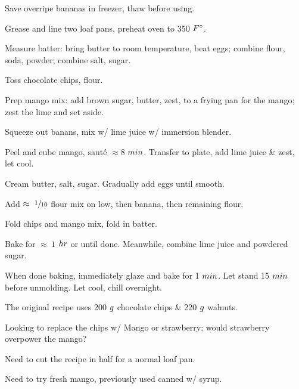 \begin{preparation}
\item Save overripe bananas in freezer, thaw before using.

\item Grease and line two loaf pans, preheat oven to 350 $\Fahrenheit$.

\item Measure batter: bring butter to room temperature, beat eggs; combine
    flour, soda, powder; combine salt, sugar.

\item Toss chocolate chips, flour.

\item Prep mango mix: add brown sugar, butter, zest, to a frying pan for the mango;
    zest the lime and set aside.

\item Squeeze out banans, mix w/ lime juice w/ immersion blender.

\item Peel and cube mango, saut\'{e} $\approx 8$ $\minute$.
    Transfer to plate, add lime juice \& zest, let cool.

\item Cream butter, salt, sugar.
    Gradually add eggs until smooth.

\item Add $\approx~\onetenth$ flour mix on low, then banana, then remaining flour.

\item Fold chips and mango mix, fold in batter.

\item Bake for $\approx~1$ $\hour$ or until done.
    Meanwhile, combine lime juice and powdered sugar.

\item When done baking, immediately glaze and bake for 1 $\minute$.
    Let stand 15 $\minute$ before unmolding.
    Let cool, chill overnight.
\end{preparation}

\begin{variation}
\item The original recipe uses 200 $\gram$ chocolate chips \& 220 $\gram$ walnuts.
\end{variation}

\begin{experiments}
\item Looking to replace the chips w/ Mango or strawberry; would strawberry
    overpower the mango?
\item Need to cut the recipe in half for a normal loaf pan.
\item Need to try fresh mango, previously used canned w/ syrup.
\end{experiments}

\recipeend%
